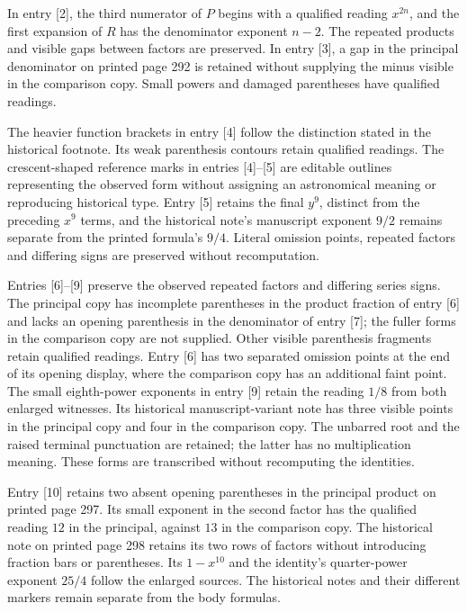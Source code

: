 In entry [2], the third numerator of $P$ begins with a qualified reading $x^{2n}$, and the first expansion of $R$ has the denominator exponent $n-2$. The repeated products and visible gaps between factors are preserved. In entry [3], a gap in the principal denominator on printed page 292 is retained without supplying the minus visible in the comparison copy. Small powers and damaged parentheses have qualified readings.

The heavier function brackets in entry [4] follow the distinction stated in the historical footnote. Its weak parenthesis contours retain qualified readings. The crescent-shaped reference marks in entries [4]–[5] are editable outlines representing the observed form without assigning an astronomical meaning or reproducing historical type. Entry [5] retains the final $y^9$, distinct from the preceding $x^9$ terms, and the historical note's manuscript exponent $9/2$ remains separate from the printed formula's $9/4$. Literal omission points, repeated factors and differing signs are preserved without recomputation.

Entries [6]–[9] preserve the observed repeated factors and differing series signs. The principal copy has incomplete parentheses in the product fraction of entry [6] and lacks an opening parenthesis in the denominator of entry [7]; the fuller forms in the comparison copy are not supplied. Other visible parenthesis fragments retain qualified readings. Entry [6] has two separated omission points at the end of its opening display, where the comparison copy has an additional faint point. The small eighth-power exponents in entry [9] retain the reading $1/8$ from both enlarged witnesses. Its historical manuscript-variant note has three visible points in the principal copy and four in the comparison copy. The unbarred root and the raised terminal punctuation are retained; the latter has no multiplication meaning. These forms are transcribed without recomputing the identities.

Entry [10] retains two absent opening parentheses in the principal product on printed page 297. Its small exponent in the second factor has the qualified reading $12$ in the principal, against $13$ in the comparison copy. The historical note on printed page 298 retains its two rows of factors without introducing fraction bars or parentheses. Its $1-x^{10}$ and the identity’s quarter-power exponent $25/4$ follow the enlarged sources. The historical notes and their different markers remain separate from the body formulas.

